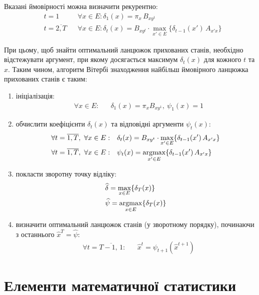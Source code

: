 Вказані ймовірності можна визначити рекурентно:
\begin{align*}
    & t = 1              && \forall x \in E: \delta_1(x)=\pi_{x}\,B_{xy^1} \\
    & t = \overline{2,T} && \forall x \in E: \delta_{t}(x)=B_{xy^{t}}\cdot\max_{x' \in E}\{\delta_{t-1}(x')\,A_{x'x}\}
\end{align*}

При цьому, щоб знайти оптимальний ланцюжок прихованих станів, необхідно відстежувати аргумент, при якому досягається максимум $\delta_t(x)$ для кожного $t$ та $x$. Таким чином, алгоритм Вітербі знаходження найбільш ймовірного ланцюжка прихованих станів є таким:

\begin{enumerate}
    \item ініціалізація:
    \begin{align*}
        &\forall x \in E: && \delta_1(x)=\pi_{x}B_{xy^1}, \ \psi_1(x)=1
    \end{align*}    
    \item обчислити коефіцієнти $\delta_t(x)$ та відповідні аргументи $\psi_t(x):$
    \begin{align*}
        &\forall t=\overline{1,T}, \ \forall x \in E: && \delta_{t}(x)=B_{xy^{t}}\cdot\max_{x'\in E}\{\delta_{t-1}(x')\,A_{x'x}\} \\
        &\forall t=\overline{1,T}, \ \forall x \in E: && \psi_{t}(x)=\operatorname*{argmax}_{x'\in E}\{\delta_{t-1}(x')\,A_{x'x}\}
    \end{align*}
    \item покласти зворотну точку відліку:
    \begin{align*}
        &\widehat{\delta}=\max_{x \in E}\{\delta_T(x)\} \\
        &\widehat{\psi}=\operatorname*{argmax}_{x \in E}\{\delta_T(x)\}
    \end{align*}
    \item визначити оптимальний ланцюжок станів (у зворотному порядку), починаючи з останнього $\widehat{x}^T=\widehat{\psi}:$
    \begin{align*}
        &\forall t=\overline{T-1,\,1}: && \widehat{x}^t=\psi_{t+1}(\widehat{x}^{t+1})
    \end{align*}
\end{enumerate}

\section{Елементи математичної статистики}

